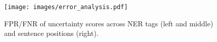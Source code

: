 \begin{figure}[t]
    \centering
    \texttt{[image: images/error\_analysis.pdf]}
    \vspace{-1.8pc}
    \caption{
    FPR/FNR of uncertainty scores across NER tags (left and middle) and sentence positions (right).
    }
    \label{fig:error_analysis}
    \vspace{-1pc}
\end{figure}